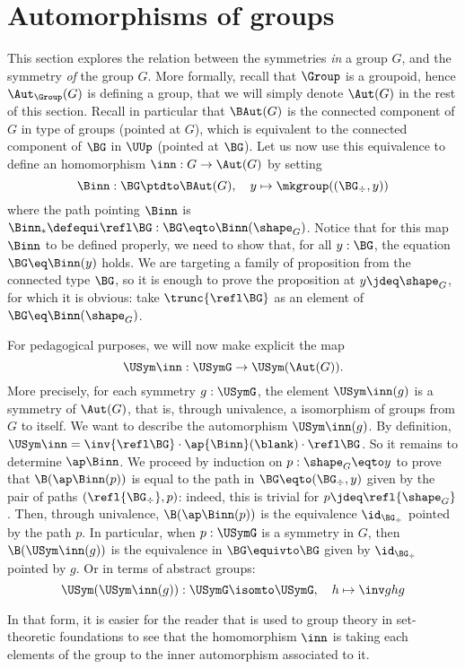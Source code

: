 \section{Automorphisms of groups}
\label{sec:aut-goup}%
%

This section explores the relation between the symmetries {\em in} a group $G$,
and the symmetry {\em of} the group $G$. More formally, recall that $\Group$ is
a groupoid, hence $\Aut_\Group(G)$ is defining a group, that we will simply
denote $\Aut(G)$ in the rest of this section. Recall in particular that
$\BAut(G)$ is the connected component of $G$ in type of groups (pointed at $G$),
which is equivalent to the connected component of $\BG$ in $\UUp$ (pointed at
$\BG$). Let us now use this equivalence to define an homomorphism
$\inn: G \to \Aut(G)$ by setting
\begin{displaymath}
  \Binn : \BG \ptdto \BAut(G), \quad y \mapsto \mkgroup((\BG_\div , y))
\end{displaymath}
where the path pointing $\Binn$ is
$\Binn_\ast \defequi \refl \BG : \BG \eqto \Binn (\shape_G)$. Notice that for
this map $\Binn$ to be defined properly, we need to show that, for all $y:\BG$,
the equation $\BG \eq \Binn(y)$ holds. We are targeting a family of proposition
from the connected type $\BG$, so it is enough to prove the proposition at
$y\jdeq \shape_G$, for which it is obvious: take $\trunc{\refl\BG}$ as an
element of $\BG \eq \Binn(\shape_G)$.

\begin{remark}
  For pedagogical purposes, we will now make explicit the map
  \begin{displaymath}
    \USym\inn: \USymG \to \USym(\Aut(G)).
  \end{displaymath}
  More precisely, for each symmetry $g:\USymG$, the element $\USym\inn(g)$ is a
  symmetry of $\Aut(G)$, that is, through univalence, a isomorphism of groups
  from $G$ to itself. We want to describe the automorphism $\USym\inn(g)$. By
  definition,
  $\USym\inn = \inv{\refl\BG} \cdot \ap {\Binn} (\blank) \cdot \refl\BG$. So it
  remains to determine $\ap \Binn$. We proceed by induction on
  $p:\shape_G \eqto y$ to prove that $\B(\ap\Binn(p))$ is equal to the path in
  $\BG \eqto (\BG_\div, y)$ given by the pair of paths $(\refl{\BG_\div}, p)$:
  indeed, this is trivial for $p\jdeq \refl{\shape_G}$. Then, through
  univalence, $\B(\ap\Binn(p))$ is the equivalence $\id_{\BG_\div}$ pointed by
  the path $p$. In particular, when $p:\USymG$ is a symmetry in $G$, then
  $\B(\USym\inn(g))$ is the equivalence in $\BG \equivto \BG$ given by
  $\id_{\BG_\div}$ pointed by $g$. Or in terms of abstract groups:
  \begin{displaymath}
    \USym(\USym\inn(g)) : \USymG \isomto \USymG, \quad h \mapsto \inv g h g
  \end{displaymath}

  In that form, it is easier for the reader that is used to group theory in
  set-theoretic foundations to see that the homomorphism $\inn$ is taking each
  elements of the group to the inner automorphism associated to it.
\end{remark}

